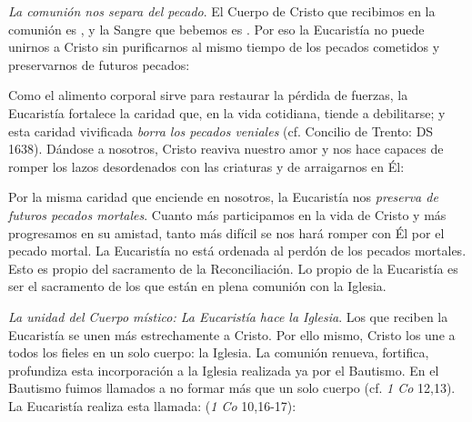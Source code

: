 \begin{ccebody}
 \textit{La comunión nos separa del pecado}. El Cuerpo de Cristo que recibimos en la comunión es , y la Sangre que bebemos es . Por eso la Eucaristía no puede unirnos a Cristo sin purificarnos al mismo tiempo de los pecados cometidos y preservarnos de futuros pecados:


 Como el alimento corporal sirve para restaurar la pérdida de fuerzas, la Eucaristía fortalece la caridad que, en la vida cotidiana, tiende a debilitarse; y esta caridad vivificada \textit{borra los pecados veniales} (cf. Concilio de Trento: DS 1638). Dándose a nosotros, Cristo reaviva nuestro amor y nos hace capaces de romper los lazos desordenados con las criaturas y de arraigarnos en Él:


 Por la misma caridad que enciende en nosotros, la Eucaristía nos \textit{preserva de futuros pecados mortales}. Cuanto más participamos en la vida de Cristo y más progresamos en su amistad, tanto más difícil se nos hará romper con Él por el pecado mortal. La Eucaristía no está ordenada al perdón de los pecados mortales. Esto es propio del sacramento de la Reconciliación. Lo propio de la Eucaristía es ser el sacramento de los que están en plena comunión con la Iglesia.

 \textit{La unidad del Cuerpo místico: La Eucaristía hace la Iglesia}. Los que reciben la Eucaristía se unen más estrechamente a Cristo. Por ello mismo, Cristo los une a todos los fieles en un solo cuerpo: la Iglesia. La comunión renueva, fortifica, profundiza esta incorporación a la Iglesia realizada ya por el Bautismo. En el Bautismo fuimos llamados a no formar más que un solo cuerpo (cf. \textit{1 Co} 12,13). La Eucaristía realiza esta llamada:  (\textit{1 Co} 10,16-17):


\end{ccebody}
